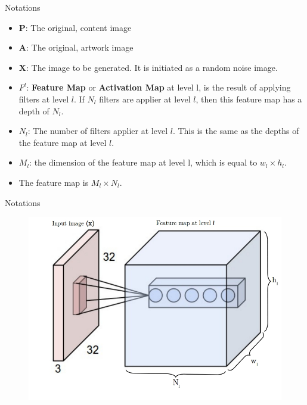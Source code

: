 \documentclass{beamer}
\begin{document}
\begin{frame}{Notations}
    \begin{itemize}
        \item $\mathbf{P}$: The original, content image
        \item $\mathbf{A}$: The original, artwork image
        \item $\mathbf{X}$: The image to be generated. It is initiated as a
            random noise image.
        \item $F^l$: \textbf{Feature Map} or \textbf{Activation Map}
            at level l, is the result of applying
            filters at level $l$. If $N_l$ filters are applier at level $l$,
            then this feature map has a depth of $N_l$.
        \item $N_l$: The number of filters applier at level $l$. This is
            the same as the depths of the feature map at level
            $l$.
        \item $M_l$: the dimension of the feature map at level l, which
            is equal to $w_l \times h_l$.
        \item The feature map is $M_l \times N_l$.
    \end{itemize}
\end{frame}



\begin{frame}{Notations}
    \begin{figure}[H]
        \centering
        \includegraphics[width=.8\textwidth]{img/levels}
    \end{figure}
\end{frame}
\end{document}
